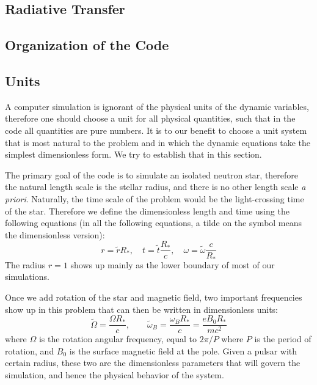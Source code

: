 \subsection{Radiative Transfer}
\label{sec:radiative-transfer}

\subsection{Organization of the Code}
\label{sec:code-organization}

\subsection{Units}
\label{sec:pic-units}

A computer simulation is ignorant of the physical units of the dynamic
variables, therefore one should choose a unit for all physical quantities, such
that in the code all quantities are pure numbers. It is to our benefit to choose
a unit system that is most natural to the problem and in which the dynamic
equations take the simplest dimensionless form. We try to establish that in this
section.

The primary goal of the code is to simulate an isolated neutron star, therefore
the natural length scale is the stellar radius, and there is no other length
scale {\it a priori}. Naturally, the time scale of the problem would be the
light-crossing time of the star. Therefore we define the dimensionless length
and time using the following equations (in all the following equations, a tilde
on the symbol means the dimensionless version):
\begin{equation}
  r = \tilde{r}R_{*},\quad t = \tilde{t}\frac{R_{*}}{c},\quad \omega = \tilde{\omega}\frac{c}{R_{*}}
\end{equation}
The radius $r = 1$ shows up mainly as the lower boundary of most of our
simulations.

Once we add rotation of the star and magnetic field, two important frequencies
show up in this problem that can then be written in dimensionless units:
\begin{equation}
  \tilde{\Omega} = \frac{\Omega R_{*}}{c},\qquad \tilde{\omega}_B = \frac{\omega_BR_{*}}{c} = \frac{e B_0R_{*}}{mc^2}
\end{equation}
where $\Omega$ is the rotation angular frequency, equal to $2\pi / P$ where $P$ is the period of rotation, and $B_0$ is the surface magnetic field at the pole. Given a pulsar with certain radius, these two are the dimensionless parameters that will govern the simulation, and hence the physical behavior of the system.

